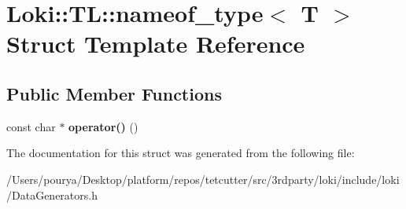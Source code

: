 \hypertarget{structLoki_1_1TL_1_1nameof__type}{}\section{Loki\+:\+:T\+L\+:\+:nameof\+\_\+type$<$ T $>$ Struct Template Reference}
\label{structLoki_1_1TL_1_1nameof__type}
\subsection*{Public Member Functions}
\begin{DoxyCompactItemize}
\item 
\hypertarget{structLoki_1_1TL_1_1nameof__type_a31768c03b465de56dddfbf8a7358a10d}{}const char $\ast$ {\bfseries operator()} ()\label{structLoki_1_1TL_1_1nameof__type_a31768c03b465de56dddfbf8a7358a10d}

\end{DoxyCompactItemize}


The documentation for this struct was generated from the following file\+:\begin{DoxyCompactItemize}
\item 
/\+Users/pourya/\+Desktop/platform/repos/tetcutter/src/3rdparty/loki/include/loki/Data\+Generators.\+h\end{DoxyCompactItemize}
